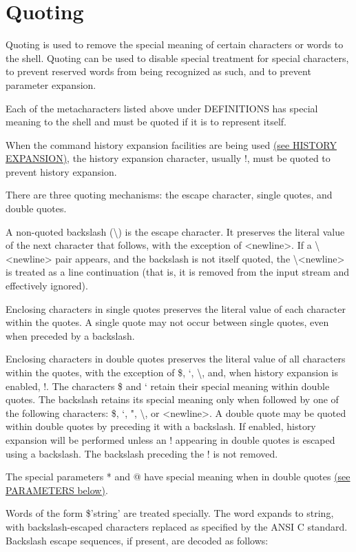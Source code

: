 \section{Quoting}\label{sec:quoting}
Quoting is used to remove the special meaning of certain characters or words to the shell. Quoting can be used to disable special treatment for special characters, to prevent reserved words from being recognized as such, and to prevent parameter expansion.

Each of the metacharacters listed above under DEFINITIONS has special meaning to the shell and must be quoted if it is to represent itself.

When the command history expansion facilities are being used \hyperref[sec:historyexpansion]{(see HISTORY EXPANSION)}, the history expansion character, usually !, must be quoted to prevent history expansion.

There are three quoting mechanisms: the escape character, single quotes, and double quotes.

A non-quoted backslash (\textbackslash) is the escape character. It preserves the literal value of the next character that follows, with the exception of <newline>. If a \textbackslash<newline> pair appears, and the backslash is not itself quoted, the \textbackslash<newline> is treated as a line continuation (that is, it is removed from the input stream and effectively ignored).

Enclosing characters in single quotes preserves the literal value of each character within the quotes. A single quote may not occur between single quotes, even when preceded by a backslash.

Enclosing characters in double quotes preserves the literal value of all characters within the quotes, with the exception of \$, `, \textbackslash, and, when history expansion is enabled, !. The characters \$ and ` retain their special meaning within double quotes. The backslash retains its special meaning only when followed by one of the following characters: \$, `, ", \textbackslash, or <newline>. A double quote may be quoted within double quotes by preceding it with a backslash. If enabled, history expansion will be performed unless an ! appearing in double quotes is escaped using a backslash. The backslash preceding the ! is not removed.

The special parameters * and @ have special meaning when in double quotes \hyperref[sec:parameters]{(see PARAMETERS below)}.

Words of the form \$'string' are treated specially. The word expands to string, with backslash-escaped characters replaced as specified by the ANSI C standard. Backslash escape sequences, if present, are decoded as follows:

